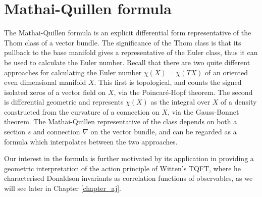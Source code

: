 
\chapter{Mathai-Quillen formula}
\label{chapter_mq}
The Mathai-Quillen formula is an explicit differential form representative of 
the Thom class of a vector bundle. The significance of the Thom class is 
that its pullback to the base manifold gives a representative of the Euler
class, thus it can be used to calculate the Euler number.  
Recall that there are two quite different approaches for calculating the Euler number
$\chi(X) = \chi(TX)$ of an oriented even dimensional manifold $X$. 
This first is topological, and counts
the signed isolated zeros of a vector field on $X$, via the Poincar\'e-Hopf theorem. The
second is differential geometric and represents  $\chi(X)$ as the integral over
$X$ of a density constructed from the curvature of a connection on $X$, via
the Gauss-Bonnet theorem. 
The Mathai-Quillen representative of the class depends on both a section $s$ and 
connection  $\nabla$ on the vector bundle, and can be regarded as a formula 
which interpolates between the two approaches.  

Our interest in the formula is further motivated by its application in providing a
geometric interpretation of the action principle of Witten's TQFT, where he
characterised Donaldson invariants as correlation functions of observables, as
we will see later in Chapter \ref{chapter_aj}. 

